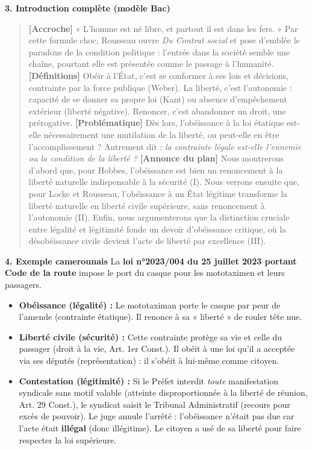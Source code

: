 \documentclass[11pt]{article}
\begin{document}
\begin{corrige}
\textbf{3. Introduction complète (modèle Bac)}
\begin{quote}
\textbf{[Accroche]} « L'homme est né libre, et partout il est dans les fers. » Par cette formule choc, Rousseau ouvre \emph{Du Contrat social} et pose d'emblée le paradoxe de la condition politique : l'entrée dans la société semble une chaîne, pourtant elle est présentée comme le passage à l'humanité.
\textbf{[Définitions]} Obéir à l'État, c'est se conformer à ses lois et décisions, contrainte par la force publique (Weber). La liberté, c'est l'autonomie : capacité de se donner sa propre loi (Kant) ou absence d'empêchement extérieur (liberté négative). Renoncer, c'est abandonner un droit, une prérogative.
\textbf{[Problématique]} Dès lors, l'obéissance à la loi étatique est-elle nécessairement une mutilation de la liberté, ou peut-elle en être l'accomplissement ? Autrement dit : \emph{la contrainte légale est-elle l'ennemie ou la condition de la liberté ?}
\textbf{[Annonce du plan]} Nous montrerons d'abord que, pour Hobbes, l'obéissance est bien un renoncement à la liberté naturelle indispensable à la sécurité (I). Nous verrons ensuite que, pour Locke et Rousseau, l'obéissance à un État légitime transforme la liberté naturelle en liberté civile supérieure, sans renoncement à l'autonomie (II). Enfin, nous argumenterons que la distinction cruciale entre légalité et légitimité fonde un devoir d'obéissance critique, où la désobéissance civile devient l'acte de liberté par excellence (III).
\end{quote}

\textbf{4. Exemple camerounais}
La \textbf{loi n°2023/004 du 25 juillet 2023 portant Code de la route} impose le port du casque pour les mototaximen et leurs passagers.
\begin{itemize}
\item \textbf{Obéissance (légalité) :} Le mototaximan porte le casque par peur de l'amende (contrainte étatique). Il renonce à sa « liberté » de rouler tête nue.
\item \textbf{Liberté civile (sécurité) :} Cette contrainte protège sa vie et celle du passager (droit à la vie, Art. 1er Const.). Il obéit à une loi qu'il a acceptée via ses députés (représentation) : il s'obéit à lui-même comme citoyen.
\item \textbf{Contestation (légitimité) :} Si le Préfet interdit \emph{toute} manifestation syndicale sans motif valable (atteinte disproportionnée à la liberté de réunion, Art. 29 Const.), le syndicat saisit le Tribunal Administratif (recours pour excès de pouvoir). Le juge annule l'arrêté : l'obéissance n'était pas due car l'acte était \textbf{illégal} (donc illégitime). Le citoyen a usé de sa liberté pour faire respecter la loi supérieure.
\end{itemize}


\end{corrige}
\end{document}
